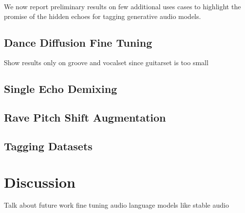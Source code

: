 \documentclass[letterpaper]{article} %
\begin{document}
We now report preliminary results on few additional uses cases to highlight the promise of the hidden echoes for tagging generative audio models.



\subsection{Dance Diffusion Fine Tuning}

Show results only on groove and vocalset since guitarset is too small


\subsection{Single Echo Demixing}



\subsection{Rave Pitch Shift Augmentation}



\subsection{Tagging Datasets}






\section{Discussion}
Talk about future work fine tuning audio language models like stable audio



\end{document}
